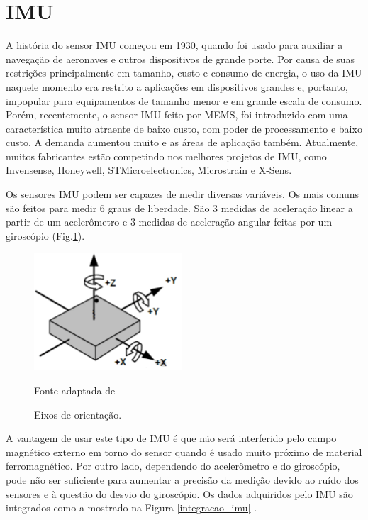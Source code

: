	\section{IMU}

		A história do sensor IMU começou em 1930, quando foi usado para auxiliar a navegação de aeronaves e outros dispositivos de grande porte. Por causa de suas restrições principalmente em tamanho, custo e consumo de energia, o uso da IMU naquele momento era restrito a aplicações em dispositivos grandes e, portanto, impopular para equipamentos de tamanho menor e em grande escala de consumo. Porém, recentemente, o sensor IMU feito por MEMS, foi introduzido com uma característica muito atraente de baixo custo, com poder de processamento e baixo custo. A demanda aumentou muito e as áreas de aplicação também. Atualmente, muitos fabricantes estão competindo nos melhores projetos de IMU, como Invensense, Honeywell, STMicroelectronics, Microstrain e X-Sens\cite{ahmad2013}.
		
		Os sensores IMU podem ser capazes de medir diversas variáveis. Os mais comuns são feitos para medir 6 graus de liberdade. São 3 medidas de aceleração linear a partir de um acelerômetro e 3 medidas de aceleração angular feitas por um giroscópio (Fig.\ref{eixos_imu})\cite{santos2016}.
		 
		\begin{figure}[h]
			\centering
			\includegraphics[keepaspectratio=true,scale=0.8]{figuras/Eixos_imu.png}
			\caption{Eixos de orientação.}
			Fonte adaptada de \cite{mpu6050}
			\label{eixos_imu}	
		\end{figure}


		A vantagem de usar este tipo de IMU é que não será interferido pelo campo magnético externo em torno do
		sensor quando é usado muito próximo de material ferromagnético. Por outro lado, dependendo do acelerômetro e do giroscópio, pode não ser suficiente para aumentar a precisão da medição devido ao ruído dos sensores e à questão do desvio do giroscópio. Os dados adquiridos pelo IMU são integrados como a mostrado na Figura \ref{integracao_imu} \cite{ahmad2013}.

